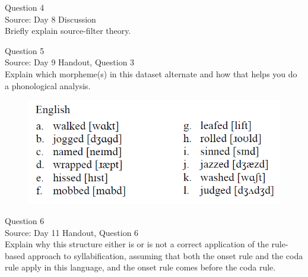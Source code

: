 \documentclass[12pt]{article}
\begin{document}
\newpage

{\large Question 4}\\

Source: Day 8 Discussion\\

Briefly explain source-filter theory.\\


\newpage

{\large Question 5}\\

Source: Day 9 Handout, Question 3\\

Explain which morpheme(s) in this dataset alternate and how that helps you do a phonological analysis.\\

\begin{figure}[H]
\includegraphics{../images/english_past.png}
\end{figure}

\newpage

{\large Question 6}\\

Source: Day 11 Handout, Question 6\\

Explain why this structure either is or is not a correct application of the rule-based approach to syllabification, assuming that both the onset rule and the coda rule apply in this language, and the onset rule comes before the coda rule.\\
\end{document}
